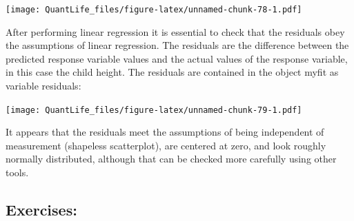 \documentclass[
]{book}
\newenvironment{Shaded}{\begin{snugshade}}{\end{snugshade}}
\newcommand{\CommentTok}[1]{\textcolor[rgb]{0.56,0.35,0.01}{\textit{#1}}}
\newcommand{\DataTypeTok}[1]{\textcolor[rgb]{0.13,0.29,0.53}{#1}}
\newcommand{\DecValTok}[1]{\textcolor[rgb]{0.00,0.00,0.81}{#1}}
\newcommand{\KeywordTok}[1]{\textcolor[rgb]{0.13,0.29,0.53}{\textbf{#1}}}
\newcommand{\NormalTok}[1]{#1}
\newcommand{\OperatorTok}[1]{\textcolor[rgb]{0.81,0.36,0.00}{\textbf{#1}}}
\newcommand{\StringTok}[1]{\textcolor[rgb]{0.31,0.60,0.02}{#1}}
\theoremstyle{definition}
\theoremstyle{definition}
\theoremstyle{definition}
\theoremstyle{remark}
\begin{document}
\begin{Shaded}
\end{Shaded}

\texttt{[image: QuantLife\_files/figure-latex/unnamed-chunk-78-1.pdf]}

After performing linear regression it is essential to check that the residuals obey the assumptions of linear regression. The residuals are the difference between the predicted response variable values and the actual values of the response variable, in this case the child height. The residuals are contained in the object myfit as variable residuals:

\begin{Shaded}
\end{Shaded}

\texttt{[image: QuantLife\_files/figure-latex/unnamed-chunk-79-1.pdf]}

It appears that the residuals meet the assumptions of being independent of measurement (shapeless scatterplot), are centered at zero, and look roughly normally distributed, although that can be checked more carefully using other tools.

\hypertarget{exercises-11}{%
\subsection{Exercises:}\label{exercises-11}}
\end{document}
